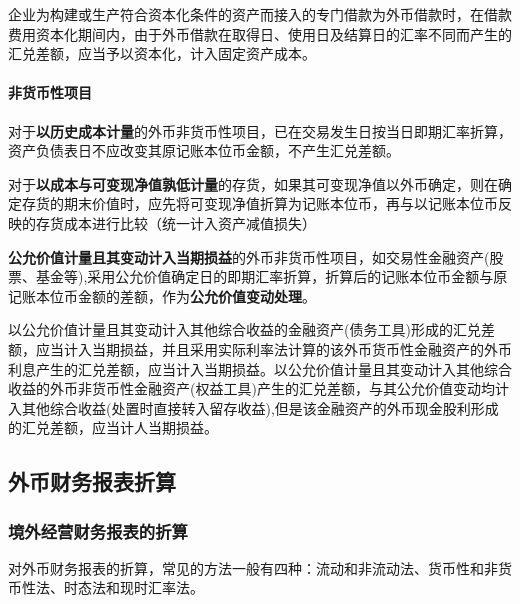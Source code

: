 \documentclass[UTF8,12pt]{ctexart}
\numberwithin{equation}{section} %
\numberwithin{figure}{section}
\numberwithin{table}{section}
\begin{document}
	企业为构建或生产符合资本化条件的资产而接入的专门借款为外币借款时，在借款费用资本化期间内，由于外币借款在取得日、使用日及结算日的汇率不同而产生的汇兑差额，应当予以资本化，计入固定资产成本。
	
	\paragraph{非货币性项目}
	
	对于\textbf{以历史成本计量}的外币非货币性项目，已在交易发生日按当日即期汇率折算，资产负债表日不应改变其原记账本位币金额，不产生汇兑差额。
	
	对于\textbf{以成本与可变现净值孰低计量}的存货，如果其可变现净值以外币确定，则在确定存货的期末价值时，应先将可变现净值折算为记账本位币，再与以记账本位币反映的存货成本进行比较（统一计入资产减值损失）
	
	\textbf{公允价值计量且其变动计入当期损益}的外币非货币性项目，如交易性金融资产(股票、基金等),采用公允价值确定日的即期汇率折算，折算后的记账本位币金额与原记账本位币金额的差额，作为\textbf{公允价值变动处理}。
	
	以公允价值计量且其变动计入其他综合收益的金融资产(债务工具)形成的汇兑差额，应当计入当期损益，并且采用实际利率法计算的该外币货币性金融资产的外币利息产生的汇兑差额，应当计入当期损益。以公允价值计量且其变动计入其他综合收益的外币非货币性金融资产(权益工具)产生的汇兑差额，与其公允价值变动均计入其他综合收益(处置时直接转入留存收益),但是该金融资产的外币现金股利形成的汇兑差额，应当计人当期损益。
	
	\subsection{外币财务报表折算}
	\subsubsection{境外经营财务报表的折算}
	对外币财务报表的折算，常见的方法一般有四种：流动和非流动法、货币性和非货币性法、时态法和现时汇率法。
	
\end{document}

